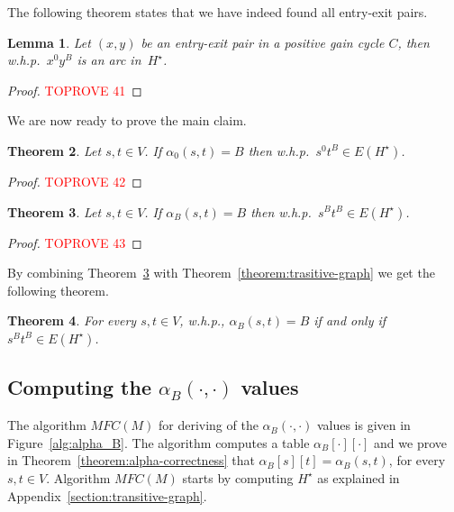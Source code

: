 \documentclass[11pt]{article}
\newtheorem{theorem}{Theorem}[section]
\newtheorem{lemma}[theorem]{Lemma}
\begin{document}
The following theorem states that we have indeed found all entry-exit pairs.
\begin{lemma}\label{lemma:find-entry-exit}
    Let $(x,y)$ be an entry-exit pair in a positive gain cycle $C$, then w.h.p.\ $x^0 y^B$ is an arc in~$H^{\star}$.
\end{lemma}

\begin{proof}\textcolor{red}{TOPROVE 41}\end{proof}

We are now ready to prove the main claim.

\begin{theorem}\label{theorem:0-B-strong}
    Let $s,t\in V$. If $\alpha_0(s,t) = B$ then w.h.p.\ $s^0 t^B \in E(H^\star)$.
\end{theorem}

\begin{proof}\textcolor{red}{TOPROVE 42}\end{proof}


\begin{theorem}\label{theorem:B-B-strong}
    Let $s,t\in V$. If $\alpha_B(s,t) = B$ then w.h.p.\ $s^B t^B \in E(H^\star)$.
\end{theorem}

\begin{proof}\textcolor{red}{TOPROVE 43}\end{proof}

By combining Theorem~\ref{theorem:B-B-strong} with Theorem~\ref{theorem:trasitive-graph} we get the following theorem.

\begin{theorem}\label{theorem:B-B-strong-full}
    For every $s,t\in V$, w.h.p., $\alpha_B(s,t)=B$ if and only if $s^B t^B \in E(H^\star)$.
\end{theorem}



\subsection{Computing the \texorpdfstring{$\alpha_B(\cdot, \cdot)$}{alphaB function} values}\label{section:compute-alpha}

The algorithm $MFC(M)$ for deriving of the $\alpha_B(\cdot,\cdot)$ values is given in Figure~\ref{alg:alpha_B}.
The algorithm computes a table $\alpha_B[\cdot][\cdot]$ and we prove in Theorem~\ref{theorem:alpha-correctness} that  $\alpha_B[s][t] = \alpha_B(s,t)$, for every $s,t\in V$. Algorithm $MFC(M)$ starts by computing $H^\star$ as explained in Appendix~\ref{section:transitive-graph}.
\end{document}
